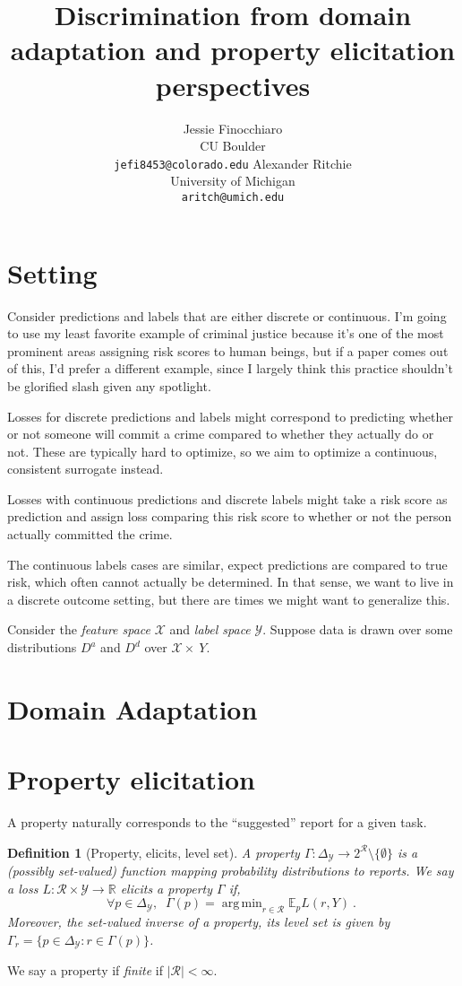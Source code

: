 \documentclass{article}
\title{Discrimination from domain adaptation and property elicitation perspectives}
\author{%
  Jessie Finocchiaro\\
  CU Boulder\\
  \texttt{jefi8453@colorado.edu} 
  \And
   Alexander Ritchie\\
   University of Michigan\\
   \texttt{aritch@umich.edu} 
}
\newcommand{\reals}{\mathbb{R}}
\newcommand{\simplex}{\Delta_\Y}
\newcommand{\E}{\mathbb{E}}
\newcommand{\R}{\mathcal{R}}
\newcommand{\X}{\mathcal{X}}
\newcommand{\Y}{\mathcal{Y}}
\newcommand{\exploss}[3]{\E_{#3} #1(#2,Y)}
\newtheorem{definition}{Definition}
\DeclareMathOperator*{\argmin}{arg\,min}
\begin{document}
\maketitle

\begin{abstract}

\end{abstract}

\section{Setting}
Consider predictions and labels that are either discrete or continuous.
I'm going to use my least favorite example of criminal justice because it's one of the most prominent areas assigning risk scores to human beings, but if a paper comes out of this, I'd prefer a different example, since I largely think this practice shouldn't be glorified slash given any spotlight.

Losses for discrete predictions and labels might correspond to predicting whether or not someone will commit a crime compared to whether they actually do or not.
These are typically hard to optimize, so we aim to optimize a continuous, consistent surrogate instead.

Losses with continuous predictions and discrete labels might take a risk score as prediction and assign loss comparing this risk score to whether or not the person actually committed the crime.

The continuous labels cases are similar, expect predictions are compared to true risk, which often cannot actually be determined.
In that sense, we want to live in a discrete outcome setting, but there are times we might want to generalize this.

Consider the \emph{feature space} $\X$ and \emph{label space} $\Y$.
Suppose data is drawn over some distributions $D^a$ and $D^d$ over $\X \times\ Y$.

\section{Domain Adaptation}

\section{Property elicitation}

A property naturally corresponds to the ``suggested'' report for a given task.
\begin{definition}[Property, elicits, level set]
	A \emph{property} $\Gamma: \simplex \to 2^{\R} \setminus \{ \emptyset\}$ is a (possibly set-valued) function mapping probability distributions to reports.
	We say a loss $L : \R \times\Y \to \reals$ \emph{elicits} a property $\Gamma$ if,
	\begin{equation}
	\forall p \in \simplex, \;\; \Gamma(p) = \argmin_{r \in \R} \exploss{L}{r}{p}~.~
	\end{equation}
	Moreover, the set-valued inverse of a property, its \emph{level set} is given by $\Gamma_r = \{p \in \simplex : r \in \Gamma(p)\}$.
\end{definition}
We say a property if \emph{finite} if $|\R| < \infty$.
\end{document}
